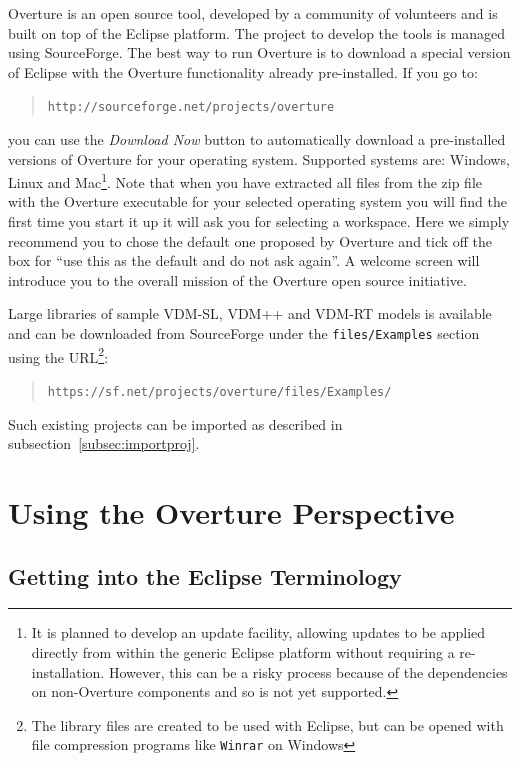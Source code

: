 \documentclass{overturerepsec}
\newcommand{\url}[1]{\texttt{#1}}
\begin{document}
Overture is an open source tool, developed by a community of volunteers 
and is built on top of the Eclipse platform. The project to develop the tools 
is managed using SourceForge.  The best way to run Overture is to download 
a special version of Eclipse with the Overture functionality already pre-installed. If you go to:
  \begin{quote}
  \url{http://sourceforge.net/projects/overture}
  \end{quote}
  \noindent you can use the \textit{Download Now} button to
  automatically download a pre-installed versions of Overture for your
  operating system.  Supported systems are: Windows, Linux and
  Mac\footnote{It is planned to develop an update facility, allowing
    updates to be applied directly from within the generic Eclipse
    platform without requiring a re-installation. However, this can be
    a risky process because of the dependencies on non-Overture
    components and so is not yet supported.}.
Note that when you have extracted all files from the zip file with the
Overture executable for your selected operating system you will find
the first time you start it up it will ask you for selecting a
workspace. Here we simply recommend you to chose the default one proposed 
by Overture and tick off the box for ``use this as the default and do
not ask again''. A welcome screen will introduce you to the overall 
mission of the Overture open source initiative. 

Large libraries of sample VDM-SL, VDM++ and VDM-RT models is available
and can be downloaded from SourceForge under the
\texttt{files/Examples} section using the URL\footnote{The library
  files are created to be used with Eclipse, but can be opened with
  file compression programs like \texttt{Winrar} on Windows}:
\begin{quote}
\url{https://sf.net/projects/overture/files/Examples/}
\end{quote}
Such existing projects can be imported as described in
subsection~\ref{subsec:importproj}. 

\section{Using the Overture Perspective}\label{sec:vdmsupport}

\subsection{Getting into the Eclipse Terminology}
\end{document}
